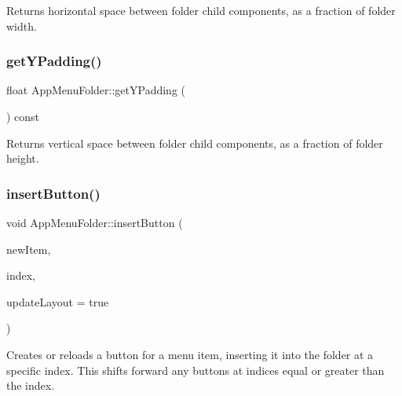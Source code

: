 \begin{DoxyReturn}{Returns}
horizontal space between folder child components, as a fraction of folder width. 
\end{DoxyReturn}
\mbox{\label{classAppMenuFolder_a5ee8ea67c84cf8c412ff77a3233ec6ad}} 
\subsubsection{\texorpdfstring{get\+Y\+Padding()}{getYPadding()}}
{\footnotesize\ttfamily float App\+Menu\+Folder\+::get\+Y\+Padding (\begin{DoxyParamCaption}{ }\end{DoxyParamCaption}) const}

\begin{DoxyReturn}{Returns}
vertical space between folder child components, as a fraction of folder height. 
\end{DoxyReturn}
\mbox{\label{classAppMenuFolder_a1a87de8b490dac5d26afca1947c70708}} 
\subsubsection{\texorpdfstring{insert\+Button()}{insertButton()}}
{\footnotesize\ttfamily void App\+Menu\+Folder\+::insert\+Button (\begin{DoxyParamCaption}\item[{\mbox{\hyperlink{classAppMenuItem_ab5f51c5d74f8df62b8862c0cc8126cb7}{App\+Menu\+Item\+::\+Ptr}}}]{new\+Item,  }\item[{int}]{index,  }\item[{bool}]{update\+Layout = {\ttfamily true} }\end{DoxyParamCaption})}

Creates or reloads a button for a menu item, inserting it into the folder at a specific index. This shifts forward any buttons at indices equal or greater than the index.


